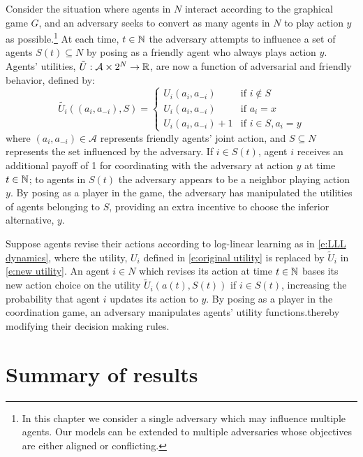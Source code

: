 Consider the situation where agents in $N$ interact according to the graphical game $G$, and an adversary seeks to  convert as many agents in $N$ to play action $y$ as possible.\footnote{In this chapter we consider a single adversary which may influence multiple agents. Our models can be extended to multiple adversaries whose objectives are either aligned or conflicting.} 
At each time, $t\in \mathbb{N}$ the adversary attempts to influence a set of agents $S(t)\subseteq N$ by posing as a friendly agent who always plays action $y$. Agents' utilities, $\tilde{U}:\mathcal{A}\times 2^N\to\mathbb{R}$, are now a function of adversarial and friendly behavior, defined by:
\begin{equation}\label{e:new utility}
\tilde{U_i}((a_i,a_{-i}),S) = %
\begin{cases}
U_i(a_i,a_{-i})	&\text{if } i\notin S\\
U_i(a_i,a_{-i})	&\text{if } a_i = x\\
U_i(a_i,a_{-i}) + 1 &\text{if } i\in S,  a_i = y 
\end{cases}
\end{equation}
where $(a_i,a_{-i})\in\mathcal{A}$ represents friendly agents' joint action, and $S\subseteq N$ represents the set influenced by the adversary.
If  $i\in S(t)$, agent $i$ receives an additional payoff of 1 for coordinating with the adversary at action $y$ at time $t\in\mathbb{N}$; to agents in $S(t)$ the adversary appears to be a neighbor playing action $y$. By posing as a player in the game, the adversary has manipulated the utilities of agents belonging to $S$, providing an extra incentive to choose the inferior alternative, $y$. 

Suppose agents revise their actions according to log-linear learning as in \eqref{e:LLL dynamics}, where the utility, $U_i$ defined in \eqref{e:original utility} is replaced by $\tilde{U}_i$ in \eqref{e:new utility}. An agent $i\in N$ which revises its action at time $t\in\mathbb{N}$ bases its new action choice on the utility $\tilde{U}_i(a(t),S(t))$ if $i\in S(t)$, increasing the probability that agent $i$ updates its action to $y$. By posing as a player in the coordination game, an adversary manipulates agents' utility functions.thereby modifying their decision making rules.



\section{Summary of results}

